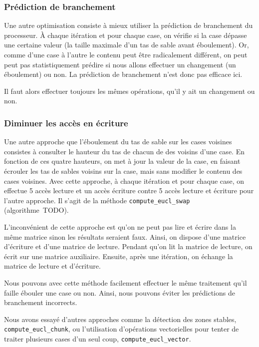 \subsubsection{Prédiction de branchement}

Une autre optimisation consiste à mieux utiliser la prédiction de
branchement du processeur. À chaque itération et pour chaque case, on
vérifie si la case dépasse une certaine valeur (la taille maximale
d'un tas de sable avant éboulement). Or, comme d'une case à l'autre le
contenu peut être radicalement différent, on peut peut pas
statistiquement prédire si nous allons effectuer un changement (un
éboulement) ou non. La prédiction de branchement n'est donc pas
efficace ici.
\medskip

Il faut alors effectuer toujours les mêmes opérations, qu'il y ait
un changement ou non.
\medskip

\subsubsection{Diminuer les accès en écriture}

Une autre approche que l'éboulement du tas de sable sur les cases
voisines consistes à consulter le hauteur du tas de chacun de des
voisins d'une case. En fonction de ces quatre hauteurs, on met à jour
la valeur de la case, en faisant écrouler les tas de sables voisins
sur la case, mais sans modifier le contenu des cases voisines. Avec
cette approche, à chaque itération et pour chaque case, on effectue 5
accès lecture et un accès écriture contre 5 accès lecture et écriture
pour l'autre approche. Il s'agit de la méthode
\texttt{compute\_eucl\_swap} (algorithme~TODO).
\medskip

L'inconvénient de cette approche est qu'on ne peut pas lire et écrire
dans la même matrice sinon les résultats seraient faux. Ainsi, on
dispose d'une matrice d'écriture et d'une matrice de lecture. Pendant
qu'on lit la matrice de lecture, on écrit sur une matrice
auxiliaire. Ensuite, après une itération, on échange la matrice de
lecture et d'écriture.
\medskip

Nous pouvons avec cette méthode facilement effectuer le même
traitement qu'il faille ébouler une case ou non. Ainsi, nous pouvons
éviter les prédictions de branchement incorrects.
\bigskip

Nous avons essayé d'autres approches comme la détection des zones
stables, \texttt{compute\_\-eucl\_\-chunk}, ou l'utilisation
d'opérations vectorielles pour tenter de traiter plusieurs cases d'un
seul coup, \texttt{compute\_\-eucl\_\-vector}.
\medskip

